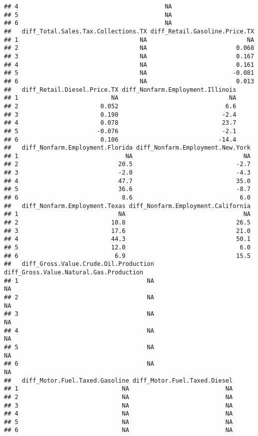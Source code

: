 \documentclass[
]{article}
\begin{document}
\begin{verbatim}
## 4                                         NA
## 5                                         NA
## 6                                         NA
##   diff_Total.Sales.Tax.Collections.TX diff_Retail.Gasoline.Price.TX
## 1                                  NA                            NA
## 2                                  NA                         0.068
## 3                                  NA                         0.167
## 4                                  NA                         0.161
## 5                                  NA                        -0.081
## 6                                  NA                         0.013
##   diff_Retail.Diesel.Price.TX diff_Nonfarm.Employment.Illinois
## 1                          NA                               NA
## 2                       0.052                              6.6
## 3                       0.190                             -2.4
## 4                       0.078                             23.7
## 5                      -0.076                             -2.1
## 6                       0.106                            -14.4
##   diff_Nonfarm.Employment.Florida diff_Nonfarm.Employment.New.York
## 1                              NA                               NA
## 2                            20.5                             -2.7
## 3                            -2.0                             -4.3
## 4                            47.7                             35.0
## 5                            36.6                             -8.7
## 6                             8.6                              6.0
##   diff_Nonfarm.Employment.Texas diff_Nonfarm.Employment.California
## 1                            NA                                 NA
## 2                          10.8                               26.5
## 3                          17.6                               21.0
## 4                          44.3                               50.1
## 5                          12.0                                6.0
## 6                           6.9                               15.5
##   diff_Gross.Value.Crude.Oil.Production diff_Gross.Value.Natural.Gas.Production
## 1                                    NA                                      NA
## 2                                    NA                                      NA
## 3                                    NA                                      NA
## 4                                    NA                                      NA
## 5                                    NA                                      NA
## 6                                    NA                                      NA
##   diff_Motor.Fuel.Taxed.Gasoline diff_Motor.Fuel.Taxed.Diesel
## 1                             NA                           NA
## 2                             NA                           NA
## 3                             NA                           NA
## 4                             NA                           NA
## 5                             NA                           NA
## 6                             NA                           NA
\end{verbatim}
\end{document}
